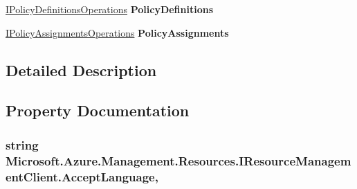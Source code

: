 \begin{DoxyCompactItemize}
\item 
\hyperlink{interface_microsoft_1_1_azure_1_1_management_1_1_resources_1_1_i_policy_definitions_operations}{I\+Policy\+Definitions\+Operations} {\bfseries Policy\+Definitions}\hypertarget{interface_microsoft_1_1_azure_1_1_management_1_1_resources_1_1_i_resource_management_client_abceaf6f434c1716d3ab8db01543d1fb3}{}\label{interface_microsoft_1_1_azure_1_1_management_1_1_resources_1_1_i_resource_management_client_abceaf6f434c1716d3ab8db01543d1fb3}

\item 
\hyperlink{interface_microsoft_1_1_azure_1_1_management_1_1_resources_1_1_i_policy_assignments_operations}{I\+Policy\+Assignments\+Operations} {\bfseries Policy\+Assignments}\hypertarget{interface_microsoft_1_1_azure_1_1_management_1_1_resources_1_1_i_resource_management_client_a310626ebf6e4e98278d3b2f734f2ce95}{}\label{interface_microsoft_1_1_azure_1_1_management_1_1_resources_1_1_i_resource_management_client_a310626ebf6e4e98278d3b2f734f2ce95}

\end{DoxyCompactItemize}


\subsection{Detailed Description}




\subsection{Property Documentation}
\subsubsection[{\texorpdfstring{Accept\+Language}{AcceptLanguage}}]{\setlength{\rightskip}{0pt plus 5cm}string Microsoft.\+Azure.\+Management.\+Resources.\+I\+Resource\+Management\+Client.\+Accept\+Language\hspace{0.3cm}{\ttfamily [get]}, {\ttfamily [set]}}\hypertarget{interface_microsoft_1_1_azure_1_1_management_1_1_resources_1_1_i_resource_management_client_ad77527c37922f39b139a21d4c973d1fd}{}\label{interface_microsoft_1_1_azure_1_1_management_1_1_resources_1_1_i_resource_management_client_ad77527c37922f39b139a21d4c973d1fd}


